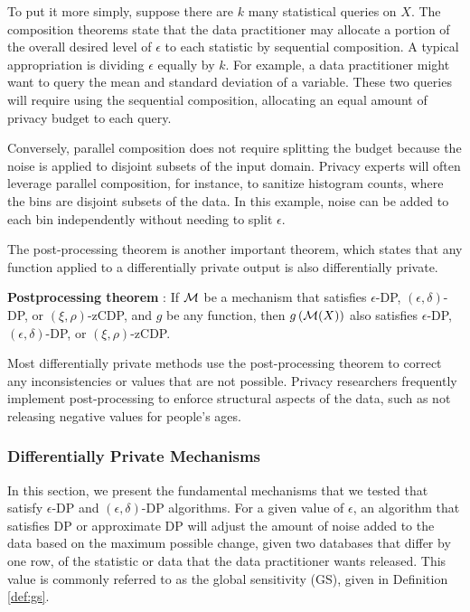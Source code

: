 To put it more simply, suppose there are $k$ many statistical queries on $X$. The composition theorems state that the data practitioner may allocate a portion of the overall desired level of $\epsilon$ to each statistic by sequential composition. A typical appropriation is dividing $\epsilon$ equally by $k$. For example, a data practitioner might want to query the mean and standard deviation of a variable. These two queries will require using the sequential composition, allocating an equal amount of privacy budget to each query.

Conversely, parallel composition does not require splitting the budget because the noise is applied to disjoint subsets of the input domain. Privacy experts will often leverage parallel composition, for instance, to sanitize histogram counts, where the bins are disjoint subsets of the data. In this example, noise can be added to each bin independently without needing to split $\epsilon$.

The post-processing theorem is another important theorem, which states that any function applied to a differentially private output is also differentially private.

\begin{thm}\label{thm:post} \textbf{Postprocessing theorem} \citep{dwork2006calibrating,nissim2007smooth, bun2016concentrated}:
If $\mathcal{M}$ be a mechanism that satisfies $\epsilon$-DP, $(\epsilon,\delta)$-DP, or $(\xi,\rho)$-zCDP, and $g$ be any function, then $g\left(\mathcal{M}(X)\right)$ also satisfies $\epsilon$-DP, $(\epsilon,\delta)$-DP, or $(\xi,\rho)$-zCDP.
\end{thm}

Most differentially private methods use the post-processing theorem to correct any inconsistencies or values that are not possible. Privacy researchers frequently implement post-processing to enforce structural aspects of the data, such as not releasing negative values for people's ages.

\subsubsection{Differentially Private Mechanisms}\label{subsec:mech}
In this section, we present the fundamental mechanisms that we tested that satisfy $\epsilon$-DP and $(\epsilon, \delta)$-DP algorithms. For a given value of $\epsilon$, an algorithm that satisfies DP or approximate DP will adjust the amount of noise added to the data based on the maximum possible change, given two databases that differ by one row, of the statistic or data that the data practitioner wants released. This value is commonly referred to as the global sensitivity (GS), given in Definition \ref{def:gs}.

